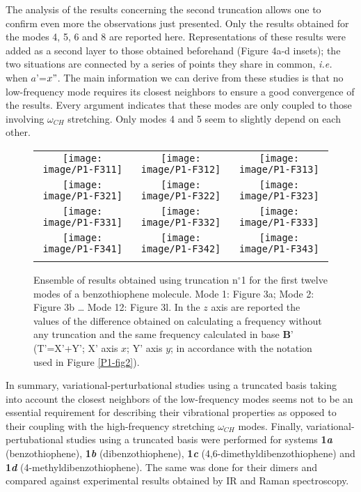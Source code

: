 	The analysis of the results concerning the second truncation allows one to confirm even more the observations just presented. Only the results obtained for the modes 4, 5, 6 and 8 are reported here. Representations of these results were added as a second layer to those obtained beforehand (Figure 4a-d insets); the two situations are connected by a series of points they share in common, \textit{i.e.} when $a’$=$x"$. The main information we can derive from these studies is that no low-frequency mode requires its closest neighbors to ensure a good convergence of the results. Every argument indicates that these modes are only coupled to those involving $\omega_{CH}$ stretching. Only modes 4 and 5 seem to slightly depend on each other.\\
	
	\begin{figure}[H]
		\begin{center}
			\begin{tabular}{c c c}
				\texttt{[image: image/P1-F311]} & \texttt{[image: image/P1-F312]} &\texttt{[image: image/P1-F313]} \\
				\texttt{[image: image/P1-F321]} & \texttt{[image: image/P1-F322]} & \texttt{[image: image/P1-F323]} \\
				\texttt{[image: image/P1-F331]} & \texttt{[image: image/P1-F332]} & \texttt{[image: image/P1-F333]} \\
				\texttt{[image: image/P1-F341]} & \texttt{[image: image/P1-F342]} & \texttt{[image: image/P1-F343]}\\   \label{P1-F3}
			\end{tabular}
		\end{center}
		\caption[Ensemble of results obtained using truncation n$^{\circ}$1 for the first twelve modes of a benzothiophene molecule]{Ensemble of results obtained using truncation n$^{\circ}$1 for the first twelve modes of a benzothiophene molecule. Mode 1: Figure 3a; Mode 2: Figure 3b … Mode 12: Figure 3l.
			In the $z$ axis are reported the values of the difference obtained on calculating a frequency without any truncation and the same frequency calculated in base $\textbf{B’}$ (T’=X’+Y’; X’ axis $x$; Y’ axis $y$; in accordance with the notation used in Figure \ref{P1-fig2}).}
	\end{figure}
	
	In summary, variational-perturbational studies using a truncated basis taking into account the closest neighbors of the low-frequency modes seems not to be an essential requirement for describing their vibrational properties as opposed to their coupling with the high-frequency stretching $\omega_{CH}$ modes. Finally, variational-pertubational studies using a truncated basis were performed for systems \textbf{1\textit{a}} (benzothiophene), \textbf{1\textit{b}} (dibenzothiophene), \textbf{1\textit{c}} (4,6-dimethyldibenzothiophene) and \textbf{1\textit{d}} (4-methyldibenzothiophene). The same was done for their dimers and compared against experimental results obtained by IR and Raman spectroscopy.
	

